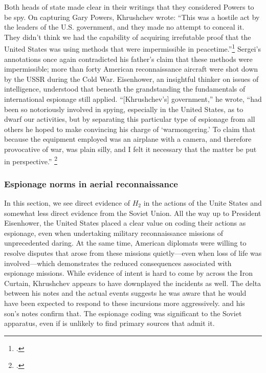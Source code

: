 \documentclass[14pt]{extarticle}
\begin{document}
Both heads of state made clear in their writings that they considered Powers to be spy. On capturing Gary Powers, Khrushchev wrote: ``This was a hostile act by the leaders of the U.S. government, and they made no attempt to conceal it. They didn't think we had the capability of \textelp{} acquiring irrefutable proof that the United States was using methods that were impermissible in peacetime.''\footcite[p.~239]{khrushchev_memoirs_2007} Sergei's annotations once again contradicted his father's claim that these methods were impermissible; more than forty American reconnaissance aircraft were shot down by the USSR during the Cold War. Eisenhower, an insightful thinker on issues of intelligence, understood that beneath the grandstanding the fundamentals of international espionage still applied. \enquote{[Khrushchev's] government,} he wrote, \enquote{had been so notoriously involved in spying, especially in the United States, as to dwarf our activities, but by separating this particular type of espionage from all others he hoped to make convincing his charge of \enquote{warmongering.} To claim that because the equipment employed was an airplane with a camera, and therefore provocative of war, was plain silly, and I felt it necessary that the matter be put in perspective.} \footcite[p.~551]{eisenhower_waging_1965}


\subsubsection{Espionage norms in aerial reconnaissance}

In this section, we see direct evidence of $H_2$ in the actions of the Unite States and somewhat less direct evidence from the Soviet Union. All the way up to President Eisenhower, the United States placed a clear value on coding their actions as espionage, even when undertaking military reconnaissance missions of unprecedented daring. At the same time, American diplomats were willing to resolve disputes that arose from these missions quietly---even when loss of life was involved---which demonstrates the reduced consequences associated with espionage missions. While evidence of intent is hard to come by across the Iron Curtain, Khrushchev appears to have downplayed the incidents as well. The delta between his notes and the actual events suggests he was aware that he would have been expected to respond to these incursions more aggressively. and his son's notes confirm that. The espionage coding was significant to the Soviet apparatus, even if is unlikely to find primary sources that admit it.
\end{document}
